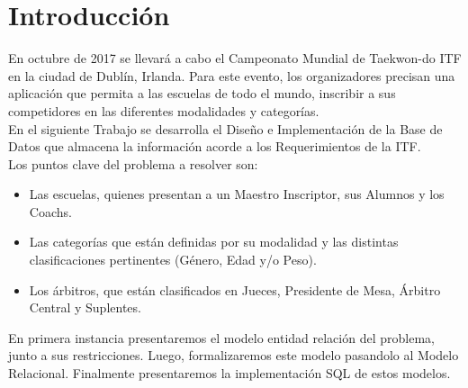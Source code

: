 \section{Introducci\'on}

En octubre de 2017 se llevará a cabo el Campeonato Mundial de Taekwon-do ITF en la ciudad de Dublín, Irlanda. Para este evento, los organizadores precisan una aplicación que permita a las escuelas de todo el mundo, inscribir a sus competidores en las diferentes modalidades y categorías.\\

En el siguiente Trabajo se desarrolla el Dise\~no e Implementaci\'on de la Base de Datos que almacena la informaci\'on acorde a los Requerimientos de la ITF.\\

Los puntos clave del problema a resolver son:
\begin{itemize}
\item Las escuelas, quienes presentan a un Maestro Inscriptor, sus Alumnos y los Coachs.
\item Las categor\'ias que est\'an definidas por su modalidad y las distintas clasificaciones pertinentes (G\'enero, Edad y/o Peso).
\item Los \'arbitros, que est\'an clasificados en Jueces, Presidente de Mesa, \'Arbitro Central y Suplentes.
\end{itemize}

En primera instancia presentaremos el modelo entidad relación del problema, junto a sus restricciones. Luego, formalizaremos este modelo pasandolo al Modelo Relacional. Finalmente presentaremos la implementación SQL de estos modelos.